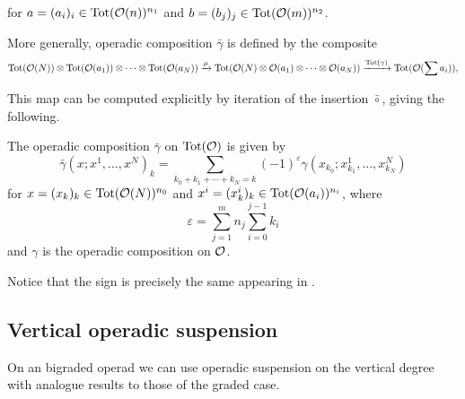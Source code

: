 \documentclass[twoside]{article}
\begin{document}
for $a=(a_i)_i\in \mathrm{Tot}({\mathcal O}(n))^{n_1}$ and $b=(b_j)_j\in \mathrm{Tot}({\mathcal O}(m))^{n_2}$.

More generally, operadic composition $\bar{\gamma}$ is defined by the composite
\begin{equation*}
\mathrm{Tot}({\mathcal O}(N))\otimes \mathrm{Tot}({\mathcal O}(a_1))\otimes\cdots\otimes \mathrm{Tot}({\mathcal O}(a_N))\xrightarrow{\mu} \mathrm{Tot}({\mathcal O}(N)\otimes {\mathcal O}(a_1)\otimes\cdots\otimes {\mathcal O}(a_N)) \xrightarrow{\mathrm{Tot}(\gamma)} \mathrm{Tot}({\mathcal O}(\sum a_i)),
\end{equation*}

This map can be computed explicitly by iteration of the insertion $\bar{\circ}$, giving the following.  %

\begin{lem}\label{totcomp}
The operadic composition $\bar{\gamma}$ on $\mathrm{Tot}({\mathcal O})$ is given by
\begin{equation*}%
\bar{\gamma}(x;x^1,\dots, x^N)_k=\sum_{k_0+k_1+\cdots+k_N=k}(-1)^{\varepsilon}\gamma(x_{k_0};x^1_{k_1},\dots, x^N_{k_N})
\end{equation*}
for $x=(x_k)_k\in\mathrm{Tot}({\mathcal O}(N))^{n_0}$ and $x^i=(x^i_k)_k\in\mathrm{Tot}({\mathcal O}(a_i))^{n_i}$, where 
\begin{equation}
\varepsilon=\sum_{j=1}^m n_j\sum_{i=0}^{j-1}k_i
\end{equation}
and $\gamma$ is the operadic composition on ${\mathcal O}$.
\end{lem}
Notice that the sign is precisely the same appearing in .




\subsection{Vertical operadic suspension}
On an bigraded operad we can use operadic suspension on the vertical degree with analogue results to those of the graded case. %

\end{document}
